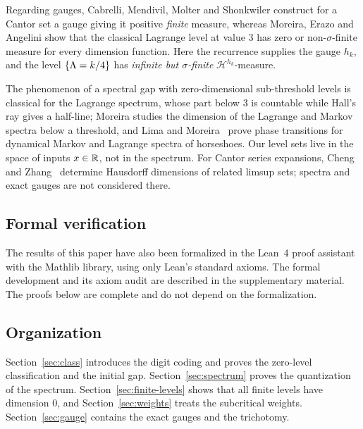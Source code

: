 Regarding gauges, Cabrelli, Mendivil, Molter and Shonkwiler
\cite[\S5, Theorem~3]{CMMS} construct for a Cantor set a gauge giving it
positive \emph{finite} measure, whereas Moreira, Erazo and Angelini \cite{MEA}
show that the classical Lagrange level at value $3$ has zero or
non-$\sigma$-finite measure for every dimension function. Here the recurrence
supplies the gauge $h_k$, and the level $\{\Lambda=k/4\}$ has \emph{infinite but
$\sigma$-finite} $\mathcal H^{h_k}$-measure.

The phenomenon of a spectral gap with zero-dimensional sub-threshold levels is
classical for the Lagrange spectrum, whose part below $3$ is countable while
Hall's ray gives a half-line; Moreira \cite{Moreira} studies the dimension of
the Lagrange and Markov spectra below a threshold, and Lima and
Moreira~\cite{LimaMoreira} prove phase transitions for dynamical Markov and
Lagrange spectra of horseshoes. Our level sets live in the space of inputs
$x\in\mathbb{R}$, not in the spectrum. For Cantor series expansions, Cheng and
Zhang~\cite{CZ} determine Hausdorff dimensions of related limsup sets; spectra
and exact gauges are not considered there.

\subsection{Formal verification}

The results of this paper have also been formalized in the Lean~4 proof
assistant with the Mathlib library, using only Lean's standard axioms. The
formal development and its axiom audit are described in the supplementary
material. The proofs below are complete and do not depend on the
formalization.

\subsection{Organization}

Section~\ref{sec:class} introduces the digit coding and proves the zero-level
classification and the initial gap. Section~\ref{sec:spectrum} proves the
quantization of the spectrum. Section~\ref{sec:finite-levels} shows that all
finite levels have dimension $0$, and Section~\ref{sec:weights} treats the
subcritical weights. Section~\ref{sec:gauge} contains the exact gauges and the
trichotomy.
